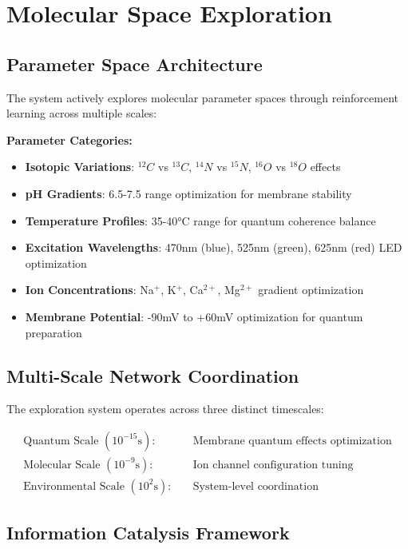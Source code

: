 \documentclass[12pt,a4paper]{article}
\begin{document}
\section{Molecular Space Exploration}

\subsection{Parameter Space Architecture}

The system actively explores molecular parameter spaces through reinforcement learning across multiple scales:

\textbf{Parameter Categories:}
\begin{itemize}
\item \textbf{Isotopic Variations}: $^{12}C$ vs $^{13}C$, $^{14}N$ vs $^{15}N$, $^{16}O$ vs $^{18}O$ effects
\item \textbf{pH Gradients}: 6.5-7.5 range optimization for membrane stability
\item \textbf{Temperature Profiles}: 35-40°C range for quantum coherence balance
\item \textbf{Excitation Wavelengths}: 470nm (blue), 525nm (green), 625nm (red) LED optimization
\item \textbf{Ion Concentrations}: Na$^+$, K$^+$, Ca$^{2+}$, Mg$^{2+}$ gradient optimization
\item \textbf{Membrane Potential}: -90mV to +60mV optimization for quantum preparation
\end{itemize}

\subsection{Multi-Scale Network Coordination}

The exploration system operates across three distinct timescales:

\begin{align}
\text{Quantum Scale } (10^{-15}\text{s}): \quad &\text{Membrane quantum effects optimization} \label{eq:quantum_scale}\\
\text{Molecular Scale } (10^{-9}\text{s}): \quad &\text{Ion channel configuration tuning} \label{eq:molecular_scale}\\
\text{Environmental Scale } (10^{2}\text{s}): \quad &\text{System-level coordination} \label{eq:env_scale}
\end{align}

\subsection{Information Catalysis Framework}
\end{document}
